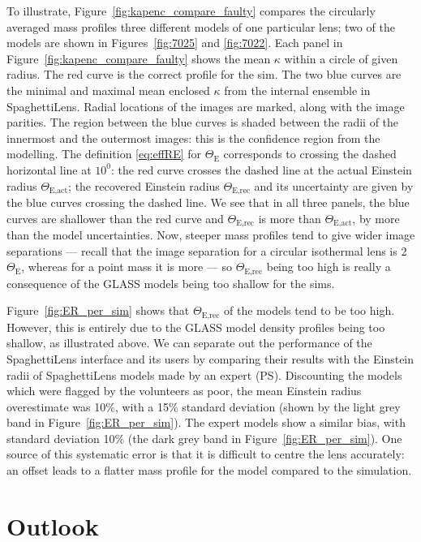\documentclass[usenatbib]{mn2e}
\newcommand{\spl}{SpaghettiLens\xspace}
\newcommand{\ERf}[1][]{$\Theta_\text{E#1}$\xspace} %
\newcommand{\figref}[1]{Figure~\ref{fig:#1}}
\newcommand{\Figref}[1]{Figure~\ref{fig:#1}}
\begin{document}
To illustrate, \figref{kapenc_compare_faulty} compares the circularly
averaged mass profiles three different models of one particular lens;
two of the models are shown in Figures~\ref{fig:7025} and
\ref{fig:7022}. Each panel in \figref{kapenc_compare_faulty} shows the
mean $\kappa$ within a circle of given radius.  The red curve is the
correct profile for the sim.  The two blue curves are the minimal and
maximal mean enclosed $\kappa$ from the internal ensemble in \spl.
Radial locations of the images are marked, along with the image
parities.  The region between the blue curves is shaded between the
radii of the innermost and the outermost images: this is the
confidence region from the modelling.  The definition \eqref{eq:effRE}
for \ERf corresponds to crossing the dashed horizontal line at $10^0$:
the red curve crosses the dashed line at the actual Einstein radius
\ERf[,act]; the recovered Einstein radius \ERf[,rec] and its
uncertainty are given by the blue curves crossing the dashed line.  We
see that in all three panels, the blue curves are shallower than the
red curve and \ERf[,rec] is more than \ERf[,act], by more than the
model uncertainties.  Now, steeper mass profiles tend to give wider
image separations --- recall that the image separation for a circular
isothermal lens is 2\ERf, whereas for a point mass it is more
\citep[see, e.g.,][]{2002LNP...608....1C} --- so \ERf[,rec] being too
high is really a consequence of the GLASS models being too shallow for
the sims.


\Figref{ER_per_sim} shows that \ERf[,rec] of the models tend to be too
high.  However, this is entirely due to the GLASS model density
profiles being too shallow, as illustrated above. We can separate out
the performance of the \spl interface and its users by comparing their
results with the Einstein radii of \spl models made by an expert
(PS). Discounting the models which were flagged by the volunteers as
poor, the mean Einstein radius overestimate was 10\%, with a 15\%
standard deviation (shown by the light grey band in
\Figref{ER_per_sim}).  The expert models show a similar bias, with
standard deviation 10\% (the dark grey band in \Figref{ER_per_sim}).
One source of this systematic error is that it is difficult to centre
the lens accurately: an offset leads to a flatter mass profile for the
model compared to the simulation.



\section{Outlook} \label{sec:todo}
\end{document}
